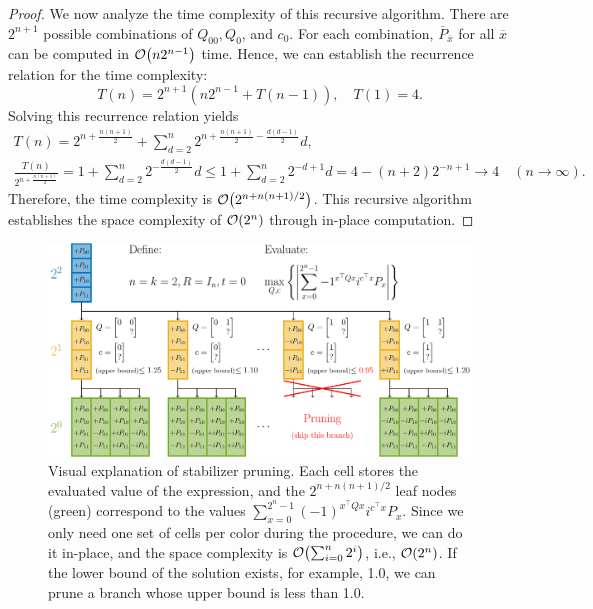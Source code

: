 \documentclass[aps,prx,onecolumn,superscriptaddress,nobibnotes,nofootinbib]{revtex4-2}
\begin{document}
\begin{proof}
  We now analyze the time complexity of this recursive algorithm. There are $2^{n+1}$ possible combinations of $Q_{00}, Q_0$, and $c_0$.
  For each combination, $\overline{P}_{\overline{x}}$ for all $\overline{x}$ can be computed in $\order{n2^{n-1}}$ time.
  Hence, we can establish the recurrence relation for the time complexity:
  \begin{equation*}
    T(n) = 2^{n+1} (n2^{n-1}+T(n-1)), \quad T(1) = 4.
  \end{equation*}
  Solving this recurrence relation yields
  \begin{gather*}
    T(n) = 2^{n+\frac{n(n+1)}{2}}+ \sum_{d=2}^{n} 2^{n+\frac{n(n+1)}{2}-\frac{d(d-1)}{2}}d,\\
    \frac{T(n)}{2^{n+\frac{n(n+1)}{2}}} = 1 + \sum_{d=2}^{n} 2^{-\frac{d(d-1)}{2}} d
    \leq 1 + \sum_{d=2}^{n} 2^{-d+1} d
    = 4-(n+2)2^{-n+1} \to 4 \quad (n \to \infty).
  \end{gather*}
  Therefore, the time complexity is $\order{2^{n+n(n+1)/2}}$.
  This recursive algorithm establishes the space complexity of $\order{2^n}$ through in-place computation.
\end{proof}
\newpage

\begin{figure}[t]
  \centering
  \includegraphics[width=\columnwidth]{imgs/dfs.pdf}
  \caption{
    Visual explanation of stabilizer pruning.
    Each cell stores the evaluated value of the expression,
    and the $2^{n+n(n+1)/2}$ leaf nodes (green) correspond to
    the values $\sum_{x=0}^{2^n-1} (-1)^{x^\top Q x} i^{c^\top x} P_x$.
    Since we only need one set of cells per color during the procedure, we can do it in-place, and the space complexity is $\order{\sum_{i=0}^{n} 2^i}$, i.e., $\order{2^n}$.
    If the lower bound of the solution exists, for example, 1.0, we can prune a branch whose upper bound is less than 1.0.
  }
  \label{fig:BB}
\end{figure}
\end{document}

